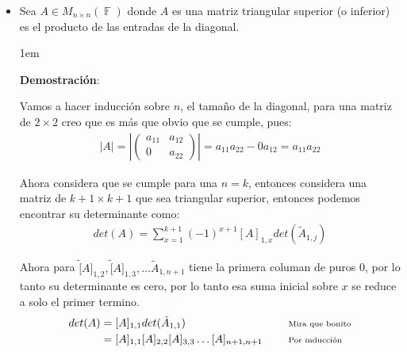 \documentclass[12pt, fleqn]{report}                             %
\newenvironment{SmallIndentation}[1][0.75em]                    %
        {\begin{adjustwidth}{#1}{}\begin{footnotesize}}             %
        {\end{footnotesize}\end{adjustwidth}}                       %
\DeclareMathOperator \Space     {\quad}                         %
\newcommand \Remember[1]    {\Space\text{\scriptsize{#1}}}      %
\theoremstyle{break}                                            %
\DeclareMathOperator \GenericField {\mathbb{F}}                 %
\newcommand{\Mag}[1]    {\left| #1 \right|}                     %
\newcommand{\pVector}[1]                                        %
        { \ensuremath{\begin{pmatrix}#1\end{pmatrix}} }             %
\begin{document}
\begin{itemize}
                    \item
                        Sea $A \in M_{n \times n}(\GenericField)$ donde $A$ es una matriz triangular
                        superior (o inferior) es el producto de las entradas de la diagonal.

                        \begin{SmallIndentation}[1em]
                            \textbf{Demostración}:
                            
                            Vamos a hacer inducción sobre $n$, el tamaño de la diagonal, para una matriz de $2 \times 2$
                            creo que es más que obvio que se cumple, pues:
                            \begin{align*}
                                |A| = \Mag{\pVector{a_{11} & a_{12} \\ 0 & a_{22}}} = a_{11}a_{22} - 0a_{12} = a_{11}a_{22}
                            \end{align*}

                            Ahora considera que se cumple para una $n = k$, entonces considera una matriz de $k+1 \times k+1$
                            que sea triangular superior, entonces podemos encontrar su determinante como:
                            \begin{align*}
                                det(A) = \sum_{x = 1}^{k+1} (-1)^{x + 1} [A]_{1, x} det(\tilde A _{1, j})     
                            \end{align*} 

                            Ahora para $\tilde [A]_{1, 2}, \tilde [A]_{1, 3}, \dots \tilde A_{1, n +1}$ tiene la primera
                            columan de puros 0, por lo tanto su determinante es cero, por lo tanto esa suma inicial sobre $x$
                            se reduce a solo el primer termino.
                            \begin{align*}
                                det(A) 
                                    &= [A]_{1, 1} det(\tilde A _{1, 1})
                                        && \Remember{Mira que bonito}                       \\
                                    &= [A]_{1, 1} [A]_{2, 2} [A]_{3, 3} \dots [A]_{n+1, n+1}
                                        && \Remember{Por inducción}
                            \end{align*}


\end{SmallIndentation}
\end{itemize}
\end{document}
